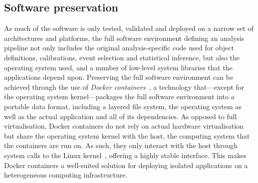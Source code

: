 \subsection{Software preservation}

As much of the software is only tested, validated and deployed on a narrow set of architectures and platforms, the full software environment defining an analysis pipeline not only includes the original analysis-specific code used for object definitions, calibrations, event selection and statistical inference, but also the operating system used, and a number of low-level system libraries that the applications depend upon.
Preserving the full software environment can be achieved through the use of \textit{Docker containers}~\cite{docker,Binet:2134524}, a technology that---except for the operating system kernel---packages the full software environment into a portable data format, including a layered file system, the operating system as well as the actual application and all of its dependencies.
As opposed to full virtualisation, Docker containers do not rely on actual hardware virtualisation but share the operating system kernel with the host, \ie the computing system that the containers are run on. As such, they only interact with the host through system calls to the Linux kernel~\cite{Binet:2134524}, offering a highly stable interface. This makes Docker containers a well-suited solution for deploying isolated applications on a heterogeneous computing infrastructure.

